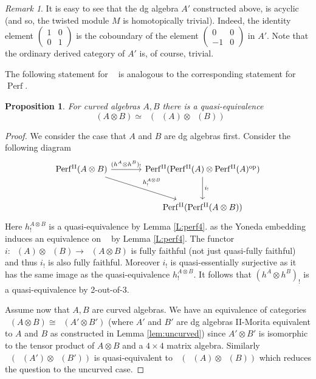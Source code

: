 \documentclass[a4paper]{amsart}
\theoremstyle{plain}
\newtheorem{prop}[thm]{Proposition}
\theoremstyle{definition}
\theoremstyle{remark}
\newtheorem{rem}[thm]{Remark}
\DeclareMathOperator{\Perf}{Perf}
\DeclareMathOperator{\PerfII}{Perf^{\mathrm{II}}}
\newcommand{\op}{\mathrm{op}}
\numberwithin{equation}{section}
\theoremstyle{plain}
\begin{document}
\begin{rem}
	It is easy to see that the dg algebra $A'$ constructed above, is acyclic (and so, the twisted module $M$ is homotopically trivial). Indeed, the identity element $\begin{pmatrix}1&0\\0&1\end{pmatrix}$ is the coboundary of the element $\begin{pmatrix}0&0\\-1&0\end{pmatrix}$ in $A'$. Note that the ordinary derived category of $A'$ is, of course, trivial. 
\end{rem}

The following statement for $\PerfII$ is analogous to the corresponding statement for $\Perf$.

	\begin{prop}\label{L:perfperf}
		For curved algebras $A, B$ there is a quasi-equivalence
		\[
		\PerfII(A \otimes B) \simeq \PerfII(\PerfII(A) \otimes \PerfII(B))
		\]
	\end{prop}
	\begin{proof}
		We consider the case that $A$ and $B$ are dg algebras first.
		Consider the following diagram
		\[
		\begin{tikzcd}[sep=large]
			\PerfII(A \otimes B) & \PerfII(\PerfII(A) \otimes \PerfII(A)^{\op}) \\
			& \PerfII(\PerfII(A \otimes B))
			\arrow["{(h^A\otimes h^B)_!}", from=1-1, to=1-2]
			\arrow["{i_!}", from=1-2, to=2-2]
			\arrow["{h^{A\otimes B}_!}", from=1-1, to=2-2]
		\end{tikzcd}
		\]
		Here $h^{A \otimes B}_!$ is a quasi-equivalence by Lemma \ref{L:perf4}.
		as the Yoneda embedding induces an equivalence on $\PerfII$ by Lemma \ref{L:perf4}.
		The functor $i: \PerfII(A)\otimes \PerfII(B) \to \PerfII(A \otimes B)$ is fully faithful (not just quasi-fully faithful)
		and thus $i_!$ is also fully faithful.
		Moreover $i_!$ is quasi-essentially surjective as it has the same image as the quasi-equivalence $h_!^{A\otimes B}$.
		It follows that $(h^A \otimes h^B)_!$  is a quasi-equivalence by 2-out-of-3. 
	
	Assume now that $A, B$ are curved algebras.
		We have an equivalence of categories $\PerfII(A\otimes B)\cong \PerfII(A'\otimes B')$ (where $A'$ and $B'$ are dg algebras II-Morita equivalent to $A$ and $B$ as constructed in Lemma \ref{lem:uncurved}) since $A'\otimes B'$ is isomorphic to the tensor product of $A\otimes B$ and a $4\times 4$ matrix algebra. 
		Similarly $\PerfII(\PerfII(A')\otimes \PerfII(B'))$ is quasi-equivalent to $\PerfII(\PerfII(A)\otimes \PerfII(B))$ which reduces the question to the uncurved case.
	\end{proof}
	
\end{document}

